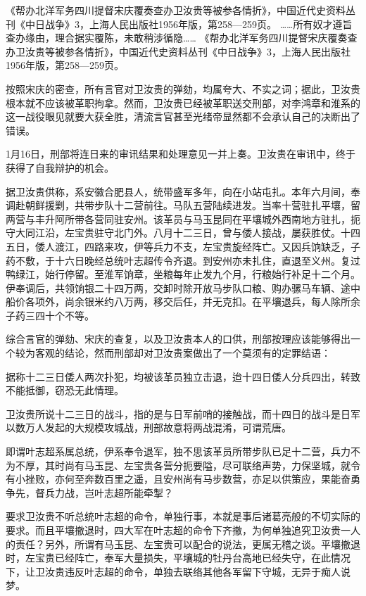 \documentclass[12pt,UTF8]{ctexbook}
\begin{document}
《帮办北洋军务四川提督宋庆覆奏查办卫汝贵等被参各情折》，中国近代史资料丛刊《中日战争》3，上海人民出版社1956年版，第258—259页。
……所有奴才遵旨查办缘由，理合据实覆陈，未敢稍涉循隐…… 《帮办北洋军务四川提督宋庆覆奏查办卫汝贵等被参各情折》，中国近代史资料丛刊《中日战争》3，上海人民出版社1956年版，第258—259页。

按照宋庆的密查，所有言官对卫汝贵的弹劾，均属夸大、不实之词；据此，卫汝贵根本就不应该被革职拘拿。然而，卫汝贵已经被革职送交刑部，对李鸿章和淮系的这一战役眼见就要大获全胜，清流言官甚至光绪帝显然都不会承认自己的决断出了错误。

1月16日，刑部将连日来的审讯结果和处理意见一并上奏。卫汝贵在审讯中，终于获得了自我辩护的机会。

据卫汝贵供称，系安徽合肥县人，统带盛军多年，向在小站屯扎。本年六月间，奉调赴朝鲜援剿，共带步队十二营前往。马队五营陆续进发。当率十营驻扎平壤，留两营与丰升阿所带各营同驻安州。该革员与马玉昆同在平壤城外西南地方驻扎，扼守大同江沿，左宝贵驻守北门外。八月十二三日，曾与倭人接战，屡获胜仗。十四五日，倭人渡江，四路来攻，伊等兵力不支，左宝贵旋经阵亡。又因兵饷缺乏，子药不敷，于十六日晚经总统叶志超传令齐退。到安州亦未扎住，直退至义州。复过鸭绿江，始行停留。至淮军饷章，坐粮每年止发九个月，行粮始行补足十二个月。伊奉调后，共领饷银二十四万两，交卸时除开放马步队口粮、购办骡马车辆、途中船价各项外，尚余银米约八万两，移交后任，并无克扣。在平壤退兵，每人除所余子药三四十个不等。

综合言官的弹劾、宋庆的查复，以及卫汝贵本人的口供，刑部按理应该能够得出一个较为客观的结论，然而刑部却对卫汝贵案做出了一个莫须有的定罪结语：

据称十二三日倭人两次扑犯，均被该革员独立击退，迨十四日倭人分兵四出，转致不能抵御，窃恐无此情理。

卫汝贵所说十二三日的战斗，指的是与日军前哨的接触战，而十四日的战斗是日军以数万人发起的大规模攻城战，刑部故意将两战混淆，可谓荒唐。

即谓叶志超系属总统，伊系奉令退军，独不思该革员所带步队已足十二营，兵力不为不厚，其时尚有马玉昆、左宝贵各营分扼要隘，尽可联络声势，力保坚城，就令有小挫败，亦何至奔数百里之遥，且安州尚有马步数营，亦足以供策应，果能奋勇争先，督兵力战，岂叶志超所能牵掣？

要求卫汝贵不听总统叶志超的命令，单独行事，本就是事后诸葛亮般的不切实际的要求。而且平壤撤退时，四大军在叶志超的命令下齐撤，为何单独追究卫汝贵一人的责任？另外，所谓有马玉昆、左宝贵可以配合的说法，更属无稽之谈。平壤撤退时，左宝贵已经阵亡，奉军大量损失，平壤城的牡丹台高地已经失守，在此情况下，让卫汝贵违反叶志超的命令，单独去联络其他各军留下守城，无异于痴人说梦。
\end{document}
